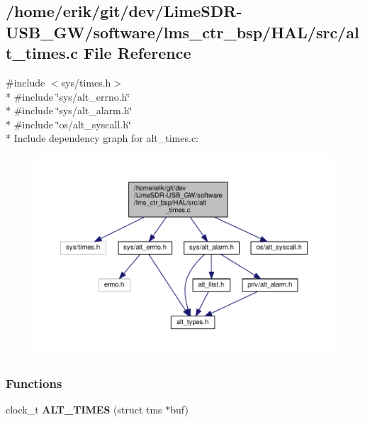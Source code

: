 \subsection{/home/erik/git/dev/\+Lime\+S\+D\+R-\/\+U\+S\+B\+\_\+\+G\+W/software/lms\+\_\+ctr\+\_\+bsp/\+H\+A\+L/src/alt\+\_\+times.c File Reference}
\label{alt__times_8c}
{\ttfamily \#include $<$sys/times.\+h$>$}\\*
{\ttfamily \#include \char`\"{}sys/alt\+\_\+errno.\+h\char`\"{}}\\*
{\ttfamily \#include \char`\"{}sys/alt\+\_\+alarm.\+h\char`\"{}}\\*
{\ttfamily \#include \char`\"{}os/alt\+\_\+syscall.\+h\char`\"{}}\\*
Include dependency graph for alt\+\_\+times.\+c\+:
\nopagebreak
\begin{figure}[H]
\begin{center}
\leavevmode
\includegraphics[width=350pt]{de/da8/alt__times_8c__incl}
\end{center}
\end{figure}
\subsubsection*{Functions}
\begin{DoxyCompactItemize}
\item 
clock\+\_\+t {\bf A\+L\+T\+\_\+\+T\+I\+M\+ES} (struct tms $\ast$buf)
\end{DoxyCompactItemize}


